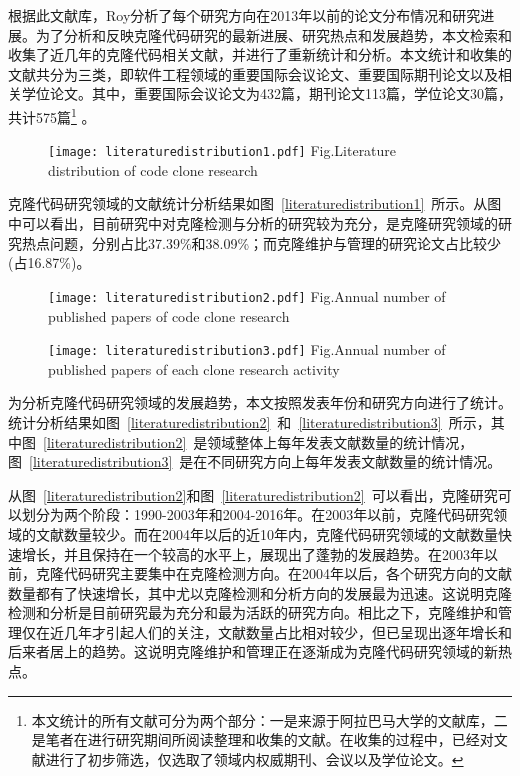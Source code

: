 根据此文献库，Roy分析了每个研究方向在2013年以前的论文分布情况和研究进展\cite{roy2014vision}。为了分析和反映克隆代码研究的最新进展、研究热点和发展趋势，本文检索和收集了近几年的克隆代码相关文献，并进行了重新统计和分析。本文统计和收集的文献共分为三类，即软件工程领域的重要国际会议论文、重要国际期刊论文以及相关学位论文。其中，重要国际会议论文为432篇，期刊论文113篇，学位论文30篇，共计575篇\footnote{本文统计的所有文献可分为两个部分：一是来源于阿拉巴马大学的文献库，二是笔者在进行研究期间所阅读整理和收集的文献。在收集的过程中，已经对文献进行了初步筛选，仅选取了领域内权威期刊、会议以及学位论文。} 。

\begin{figure}[htbp]
\centering
\texttt{[image: literaturedistribution1.pdf]}
{Fig.$\!$}{Literature distribution of code clone research}
\vspace{-1em}
\end{figure}

克隆代码研究领域的文献统计分析结果如图~\ref{literaturedistribution1}~所示。从图中可以看出，目前研究中对克隆检测与分析的研究较为充分，是克隆研究领域的研究热点问题，分别占比37.39\%和38.09\%；而克隆维护与管理的研究论文占比较少(占16.87\%)。

\begin{figure}[htbp]
\centering
\texttt{[image: literaturedistribution2.pdf]}
{Fig.$\!$}{Annual number of published papers of code clone research}
\vspace{-1em}
\end{figure}

\begin{figure}[htbp]
\centering
\texttt{[image: literaturedistribution3.pdf]}
{Fig.$\!$}{Annual number of published papers of each clone research activity}
\end{figure}

为分析克隆代码研究领域的发展趋势，本文按照发表年份和研究方向进行了统计。统计分析结果如图~\ref{literaturedistribution2}~和~\ref{literaturedistribution3}~所示，其中图~\ref{literaturedistribution2}~是领域整体上每年发表文献数量的统计情况，图~\ref{literaturedistribution3}~是在不同研究方向上每年发表文献数量的统计情况。

从图~\ref{literaturedistribution2}和图~\ref{literaturedistribution2}~可以看出，克隆研究可以划分为两个阶段：1990-2003年和2004-2016年。在2003年以前，克隆代码研究领域的文献数量较少。而在2004年以后的近10年内，克隆代码研究领域的文献数量快速增长，并且保持在一个较高的水平上，展现出了蓬勃的发展趋势。在2003年以前，克隆代码研究主要集中在克隆检测方向。在2004年以后，各个研究方向的文献数量都有了快速增长，其中尤以克隆检测和分析方向的发展最为迅速。这说明克隆检测和分析是目前研究最为充分和最为活跃的研究方向。相比之下，克隆维护和管理仅在近几年才引起人们的关注，文献数量占比相对较少，但已呈现出逐年增长和后来者居上的趋势。这说明克隆维护和管理正在逐渐成为克隆代码研究领域的新热点。


